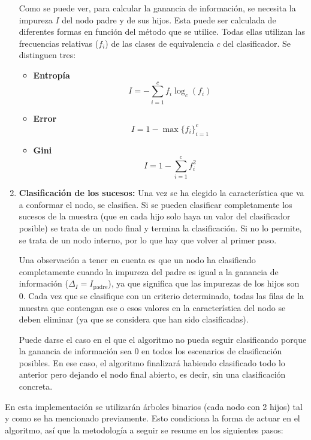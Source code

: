 \documentclass[12pt]{report}\usepackage[]{graphicx}\usepackage[dvipsnames]{xcolor}
\begin{document}
\begin{enumerate}[label = \textbf{\arabic*.}]
 					Como se puede ver, para calcular la ganancia de información, se necesita la impureza $I$ del nodo padre y de sus hijos. Esta puede ser calculada de diferentes formas en función del método que se utilice. Todas ellas utilizan las frecuencias relativas ($f_i$) de las clases de equivalencia $c$ del clasificador. Se distinguen tres:
 					
 					\begin{itemize}
 						\item \textbf{Entropía}
 						$$
 						I= - \sum_{i=1}^{c} f_i\log_{c}(f_i)
 						$$
 								
 						\item \textbf{Error}
						$$
						I = 1 - \max\{f_i\}_{i=1}^c
						$$
 						
 						\item \textbf{Gini}
						$$
						I = 1 - \sum_{i=1}^{c} f_i^2
						$$
 					\end{itemize}
 					
 					\item \textbf{Clasificación de los sucesos:} Una vez se ha elegido la característica que va a conformar el nodo, se clasifica. Si se pueden clasificar completamente los sucesos de la muestra (que en cada hijo solo haya un valor del clasificador posible) se trata de un nodo final y termina la clasificación. Si no lo permite, se trata de un nodo interno, por lo que hay que volver al primer paso.  
 					
 					Una observación a tener en cuenta es que un nodo ha clasificado completamente cuando la impureza del padre es igual a la ganancia de información ($\Delta_I = I_{\text{padre}}$), ya que significa que las impurezas de los hijos son 0. Cada vez que se clasifique con un criterio determinado, todas las filas de la muestra que contengan ese o esos valores en la característica del nodo se deben eliminar (ya que se considera que han sido clasificadas). 
 					
 					Puede darse el caso en el que el algoritmo no pueda seguir clasificando porque la ganancia de información sea 0 en todos los escenarios de clasificación posibles. En ese caso, el algoritmo finalizará habiendo clasificado todo lo anterior pero dejando el nodo final abierto, es decir, sin una clasificación concreta.
 					
 				\end{enumerate}
 				
 				En esta implementación se utilizarán árboles binarios (cada nodo con 2 hijos) tal y como se ha mencionado previamente. Esto condiciona la forma de actuar en el algoritmo, así que la metodología a seguir se resume en los siguientes pasos:
 				
\end{document}
